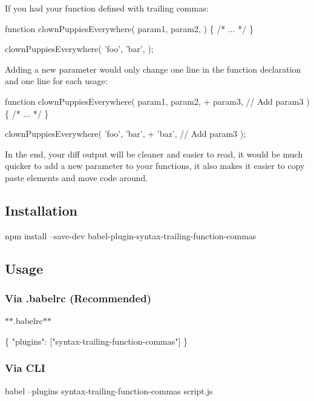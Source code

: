 If you had your function defined with trailing commas\+:


\begin{DoxyCode}
function clownPuppiesEverywhere(
  param1,
  param2,
) \{ /* ... */ \}

clownPuppiesEverywhere(
  'foo',
  'bar',
);
\end{DoxyCode}
 Adding a new parameter would only change one line in the function declaration and one line for each usage\+:


\begin{DoxyCode}
function clownPuppiesEverywhere(
  param1,
  param2,
+ param3, // Add param3
) \{ /* ... */ \}

clownPuppiesEverywhere(
  'foo',
  'bar',
+ 'baz', // Add param3
);
\end{DoxyCode}
 In the end, your diff output will be cleaner and easier to read, it would be much quicker to add a new parameter to your functions, it also makes it easier to copy paste elements and move code around.

\subsection*{Installation}


\begin{DoxyCode}
npm install --save-dev babel-plugin-syntax-trailing-function-commas
\end{DoxyCode}


\subsection*{Usage}

\subsubsection*{Via {\ttfamily .babelrc} (Recommended)}

$\ast$$\ast$.babelrc$\ast$$\ast$


\begin{DoxyCode}
\{
  "plugins": ["syntax-trailing-function-commas"]
\}
\end{DoxyCode}


\subsubsection*{Via C\+LI}


\begin{DoxyCode}
babel --plugins syntax-trailing-function-commas script.js
\end{DoxyCode}


